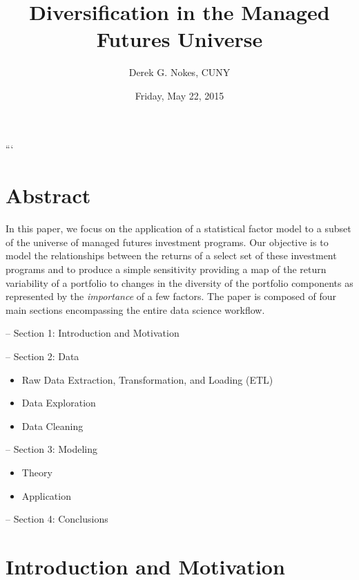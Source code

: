 \documentclass[]{article}
\title{Diversification in the Managed Futures Universe}
\author{Derek G. Nokes, CUNY}
\date{Friday, May 22, 2015}
\begin{document}
\maketitle


{
\hypersetup{linkcolor=black}
\setcounter{tocdepth}{3}
\tableofcontents
}
```

\pagebreak

\section{Abstract}\label{abstract}

In this paper, we focus on the application of a statistical factor model
to a subset of the universe of managed futures investment programs. Our
objective is to model the relationships between the returns of a select
set of these investment programs and to produce a simple sensitivity
providing a map of the return variability of a portfolio to changes in
the diversity of the portfolio components as represented by the
\emph{importance} of a few factors. The paper is composed of four main
sections encompassing the entire data science workflow.

-- Section 1: Introduction and Motivation

-- Section 2: Data

\begin{itemize}
\item
  Raw Data Extraction, Transformation, and Loading (ETL)
\item
  Data Exploration
\item
  Data Cleaning
\end{itemize}

-- Section 3: Modeling

\begin{itemize}
\item
  Theory
\item
  Application
\end{itemize}

-- Section 4: Conclusions

\pagebreak

\section{Introduction and Motivation}\label{introduction-and-motivation}
\end{document}
